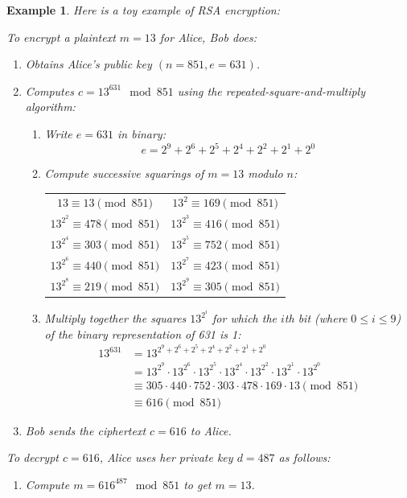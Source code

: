 \documentclass[12pt,titlepage]{article}
\newtheorem{protoexample}[prototheorem]{Example}
\newenvironment{example}
{\colorlet{shadecolor}{red!15}\begin{shaded}\begin{protoexample}\normalfont}{\end{protoexample}\end{shaded}}
\begin{document}
\begin{example}
	Here is a toy example of RSA encryption:

	To encrypt a plaintext $m = 13$ for Alice, Bob does: \begin{enumerate}
		\item Obtains Alice’s public key $(n = 851, e = 631)$.
		\item Computes $c = 13^{631} \mod 851$ using the repeated-square-and-multiply algorithm:\begin{enumerate}
			\item Write $e = 631$ in binary: $$e = 2^9 + 2^6 + 2^5 + 2^4 + 2^2 + 2^1 + 2^0$$
			\item Compute successive squarings of $m = 13$ modulo $n$:
			\begin{center}
				\begin{tabular}{cc}
					$13 \equiv 13 \pmod {851}$ & $13^2 \equiv 169 \pmod {851}$\\
					$13^{2^2} \equiv 478 \pmod {851}$ & $13^{2^3} \equiv 416 \pmod {851}$\\
					$13^{2^4} \equiv 303 \pmod {851}$ & $13^{2^5} \equiv 752 \pmod {851}$\\
					$13^{2^6} \equiv 440 \pmod {851}$ & $13^{2^7} \equiv 423 \pmod {851}$\\
					$13^{2^8} \equiv 219 \pmod {851}$ & $13^{2^9} \equiv 305 \pmod {851}$\\
				\end{tabular}
			\end{center}
			\item Multiply together the squares $13^{2^i}$ for which the $i$th bit (where $0 \leq i \leq 9$) of the binary representation of 631 is 1:\begin{align*}
				13^{631} &= 13^{2^9 + 2^6 + 2^5 + 2^4 + 2^2 + 2^1 + 2^0}\\
				&= 13^{2^9} \cdot 13^{2^6} \cdot 13^{2^5} \cdot 13^{2^4} \cdot 13^{2^2} \cdot 13^{2^1} \cdot 13^{2^0}\\
				&\equiv305 \cdot 440 \cdot 752 \cdot 303 \cdot 478 \cdot 169 \cdot 13 \pmod{851}\\
				&\equiv 616 \pmod{851}
			\end{align*}
		\end{enumerate}
		\item Bob sends the ciphertext $c = 616$ to Alice.
	\end{enumerate}

	To decrypt $c = 616$, Alice uses her private key $d = 487$ as follows:\begin{enumerate}
		\item Compute $m = 616^{487} \mod 851$ to get $m = 13$.
	\end{enumerate}
\end{example}
\end{document}
